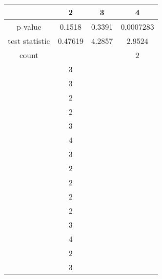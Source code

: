 \documentclass[12pt]{article}
\makeatletter
\theoremstyle{homework}
\newenvironment{exercise}[1]
{\def\@currentlabel{#1}\exercisecore}
{\endexercisecore}
\makeatother
\begin{document}
\begin{exercise}{1}
  \begin{center}
    \begin{tabular}{c|| c c c}
        & 2 & 3 & 4\\
      \hline 
      p-value        & 0.1518  &  0.3391 & 0.0007283\\
      test statistic & 0.47619 & 4.2857  & 2.9524\\
      count          &         &           & 2\\         
                                           & 3\\         
                                           & 3\\       
                                           & 2\\
                                           & 2\\         
                                           & 3\\         
                                           & 4\\       
                                           & 3\\
                                           & 2\\         
                                           & 2\\         
                                           & 2\\       
                                           & 2\\
                                           & 3\\         
                                           & 4\\         
                                           & 2\\       
                                           & 3





     \end{tabular}
    \end{center}


























\end{exercise}
\end{document}

